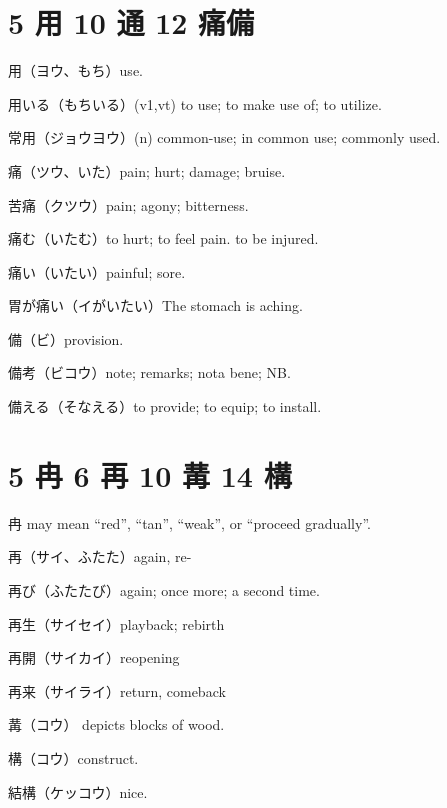 \section{5 用 10 通 12 痛備}

用（ヨウ、もち）use.

用いる（もちいる）(v1,vt) to use; to make use of; to utilize.

常用（ジョウヨウ）(n) common-use; in common use; commonly used.

痛（ツウ、いた）pain; hurt; damage; bruise.

苦痛（クツウ）pain; agony; bitterness.

痛む（いたむ）to hurt; to feel pain. to be injured.

痛い（いたい）painful; sore.

胃が痛い（イがいたい）The stomach is aching.

備（ビ）provision.

備考（ビコウ）note; remarks; nota bene; NB.

備える（そなえる）to provide; to equip; to install.

\section{5 冉 6 再 10 冓 14 構}

冉 may mean ``red'', ``tan'', ``weak'', or ``proceed gradually''.

再（サイ、ふたた）again, re-

再び（ふたたび）again; once more; a second time.

再生（サイセイ）playback; rebirth

再開（サイカイ）reopening

再来（サイライ）return, comeback

冓（コウ） depicts blocks of wood.

構（コウ）construct.

結構（ケッコウ）nice.
